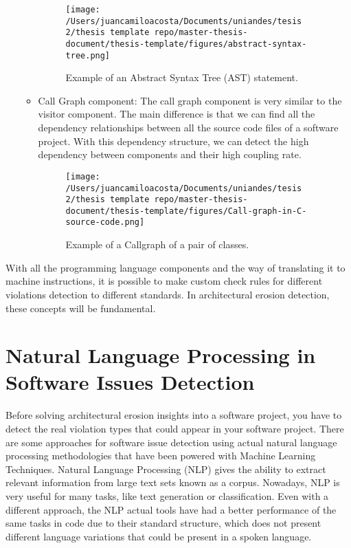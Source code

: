 \begin{itemize}
\begin{itemize}
\begin{figure}
    				\centering
    				\texttt{[image: /Users/juancamiloacosta/Documents/uniandes/tesis 2/thesis template repo/master-thesis-document/thesis-template/figures/abstract-syntax-tree.png]}
   				 \caption{Example of an Abstract Syntax Tree (AST) statement. \citet{abstract-syntax-tree} }
   				 \label{fig:ast}
			\end{figure}
			\item Call Graph component: The call graph component is very similar to the visitor component. The main difference is that we can find all the dependency relationships between all the source code files of a software project. With this dependency structure, we can detect the high dependency between components and their high coupling rate.
			\begin{figure}
    				\centering
    				\texttt{[image: /Users/juancamiloacosta/Documents/uniandes/tesis 2/thesis template repo/master-thesis-document/thesis-template/figures/Call-graph-in-C-source-code.png]}
   				 \caption{Example of a Callgraph of a pair of classes. \citet{classes_graph} }
   				 \label{fig:ast}
			\end{figure}
		\end{itemize}
\end{itemize}

With all the programming language components and the way of translating it to machine instructions, it is possible to make custom check rules for different violations detection to different standards. In architectural erosion detection, these concepts will be fundamental.

\section{Natural Language Processing in Software Issues Detection}
Before solving architectural erosion insights into a software project, you have to detect the real violation types that could appear in your software project. There are some approaches for software issue detection using actual natural language processing methodologies that have been powered with Machine Learning Techniques. Natural Language Processing (NLP) gives the ability to extract relevant information from large text sets known as a corpus. Nowadays, NLP is very useful for many tasks, like text generation or classification. Even with a different approach, the NLP actual tools have had a better performance of the same tasks in code due to their standard structure, which does not present different language variations that could be present in a spoken language.

